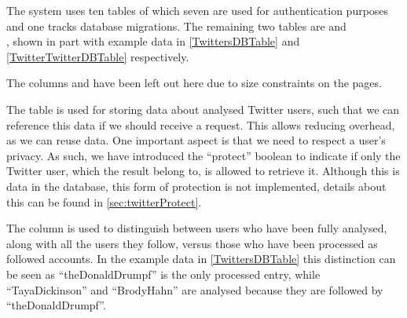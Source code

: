 The system uses ten tables of which seven are used for authentication purposes
and one tracks database migrations. The remaining two tables are 
and \\, shown in part with example data in
\autoref{TwittersDBTable} and \autoref{TwitterTwitterDBTable} respectively.\nl

The columns  and  have been left out here
due to size constraints on the pages.

\begin{table}[H]
\centering
{}
\caption{Table containing Twitter users and their determined values.}
\label{TwittersDBTable}
\end{table}

The table  is used for storing data about analysed Twitter
users, such that we can reference this data if we should receive a request. This
allows reducing overhead, as we can reuse data. One important aspect is that we
need to respect a user's privacy. As such, we have introduced the ``protect''
boolean to indicate if only the Twitter user, which the result belong to, is
allowed to retrieve it. Although this is data in the database, this form of
protection is not implemented, details about this can be found in
\autoref{sec:twitterProtect}.\nl

The  column is used to distinguish between users who have been
fully analysed, along with all the users they follow, versus those who have been
processed as followed accounts. In the example data in \autoref{TwittersDBTable}
this distinction can be seen as ``theDonaldDrumpf'' is the only processed entry,
while ``TayaDickinson'' and ``BrodyHahn'' are analysed because they are followed
by ``theDonaldDrumpf''.


